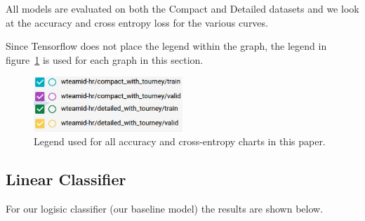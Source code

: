 \documentclass{article} %
\begin{document}
All models are evaluated on both the Compact and Detailed datasets and we look at the accuracy and cross entropy loss for the various curves.

Since Tensorflow does not place the legend within the graph, the legend in figure~\ref{fig:legend} is used for each graph in this section.


\begin{figure}[!htb]
  \includegraphics[width=0.5\textwidth]{figures/legend.png}
  \caption{Legend used for all accuracy and cross-entropy charts in this paper.}\label{fig:legend}
\end{figure}

\subsection{Linear Classifier}

For our logisic classifier (our baseline model) the results are shown below.
\end{document}
